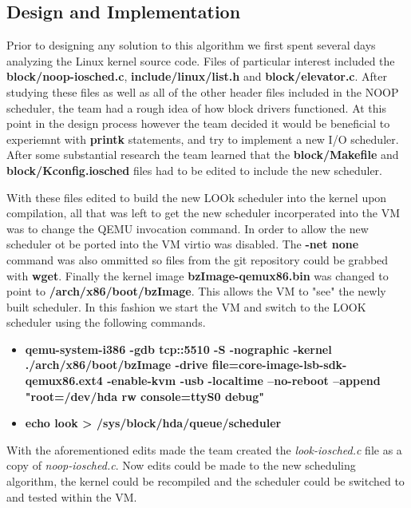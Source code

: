 \documentclass[10pt,onecolumn,draftclsnofoot]{IEEEtran} %
\begin{document}
\newpage
\begin{singlespace}
\section{\bf  Design and Implementation}

  \normalfont \indent Prior to designing any solution to this algorithm we first spent several days analyzing the Linux kernel source code. Files of particular interest included the \textbf{block/noop-iosched.c}, \textbf{include/linux/list.h} and \textbf{block/elevator.c}. After studying these files as well as all of the other header files included in the NOOP scheduler, the team had a rough idea of how block drivers functioned. At this point in the design process however the team decided it would be beneficial to experiemnt with \textbf{printk} statements, and try to implement a new I/O scheduler. After some substantial research the team learned that the \textbf{block/Makefile} and \textbf{block/Kconfig.iosched} files had to be edited to include the new scheduler. 

  \normalfont \indent With these files edited to build the new LOOk scheduler into the kernel upon compilation, all that was left to get the new scheduler incorperated into the VM was to change the QEMU invocation command. In order to allow the new scheduler ot be ported into the VM virtio was disabled. The \textbf{-net none} command was also ommitted so files from the git repository could be grabbed with \textbf{wget}. Finally the kernel image \textbf{bzImage-qemux86.bin} was changed to point to \textbf{/arch/x86/boot/bzImage}. This allows the VM to "see" the newly built scheduler. In this fashion we start the VM and switch to the LOOK scheduler using the following commands.

  \begin{itemize}
    	\item \textbf{qemu-system-i386 -gdb tcp::5510 -S -nographic -kernel ./arch/x86/boot/bzImage -drive file=core-image-lsb-sdk-qemux86.ext4 -enable-kvm -usb -localtime --no-reboot --append "root=/dev/hda rw console=ttyS0 debug"}
	\item \textbf{echo look > /sys/block/hda/queue/scheduler}
  \end{itemize}
  
	\normalfont \indent With the aforementioned edits made the team created the \textit{look-iosched.c} file as a copy of \textit{noop-iosched.c}. Now edits could be made to the new scheduling algorithm, the kernel could be recompiled and the scheduler could be switched to and tested within the VM. 


\end{singlespace}
\end{document}
